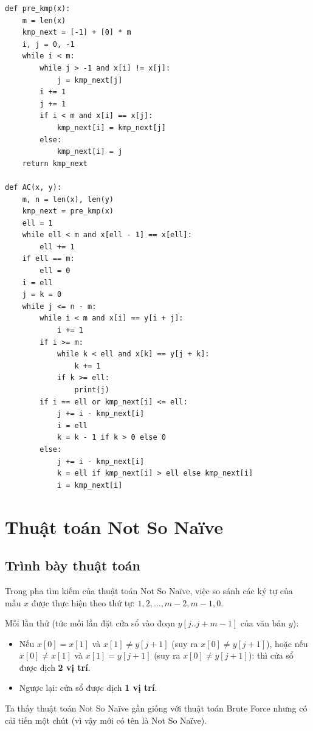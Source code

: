 \documentclass[12pt,twoside,openright]{extreport}
\begin{document}
\begin{lstlisting}[style=PythonStyle]
def pre_kmp(x):
    m = len(x)
    kmp_next = [-1] + [0] * m
    i, j = 0, -1
    while i < m:
        while j > -1 and x[i] != x[j]:
            j = kmp_next[j]
        i += 1
        j += 1
        if i < m and x[i] == x[j]:
            kmp_next[i] = kmp_next[j]
        else:
            kmp_next[i] = j
    return kmp_next

def AC(x, y):
    m, n = len(x), len(y)
    kmp_next = pre_kmp(x)
    ell = 1
    while ell < m and x[ell - 1] == x[ell]:
        ell += 1
    if ell == m:
        ell = 0
    i = ell
    j = k = 0
    while j <= n - m:
        while i < m and x[i] == y[i + j]:
            i += 1
        if i >= m:
            while k < ell and x[k] == y[j + k]:
                k += 1
            if k >= ell:
                print(j)
        if i == ell or kmp_next[i] <= ell:
            j += i - kmp_next[i]
            i = ell
            k = k - 1 if k > 0 else 0
        else:
            j += i - kmp_next[i]
            k = ell if kmp_next[i] > ell else kmp_next[i]
            i = kmp_next[i]
\end{lstlisting}

\section{Thuật toán Not So Naïve}

\subsection{Trình bày thuật toán}

Trong pha tìm kiếm của thuật toán Not So Naïve, việc so sánh các ký tự của mẫu $x$ được thực hiện theo thứ tự: $1, 2, \ldots, m-2, m-1, 0$.

Mỗi lần thử (tức mỗi lần đặt cửa sổ vào đoạn $y[j..j+m-1]$ của văn bản $y$):
\begin{itemize}
	\item Nếu $x[0] = x[1]$ và $x[1] \neq y[j+1]$ (suy ra $x[0] \neq y[j+1]$), hoặc nếu $x[0] \neq x[1]$ và $x[1] = y[j+1]$ (suy ra $x[0] \neq y[j+1]$): thì cửa sổ được dịch \textbf{2 vị trí}.
	\item Ngược lại: cửa sổ được dịch \textbf{1 vị trí}.
\end{itemize}

Ta thấy thuật toán Not So Naïve gần giống với thuật toán Brute Force nhưng có cải tiến một chút (vì vậy mới có tên là Not So Naïve).
\end{document}
